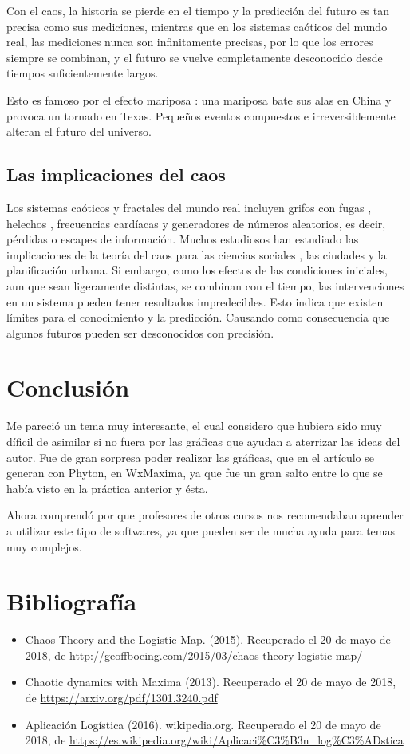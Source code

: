 \documentclass{article}
\begin{document}
Con el caos, la historia se pierde en el tiempo y la predicción del futuro es tan precisa como sus mediciones, mientras que en los sistemas caóticos del mundo real, las mediciones nunca son infinitamente precisas, por lo que los errores siempre se combinan, y el futuro se vuelve completamente desconocido desde tiempos suficientemente largos.

Esto es famoso por el efecto mariposa : una mariposa bate sus alas en China y provoca un tornado en Texas. Pequeños eventos compuestos e irreversiblemente alteran el futuro del universo.

\subsection{Las implicaciones del caos}

Los sistemas caóticos y fractales del mundo real incluyen grifos con fugas , helechos , frecuencias cardíacas y generadores de números aleatorios, es decir, pérdidas o escapes de información. Muchos estudiosos han estudiado las implicaciones de la teoría del caos para las ciencias sociales , las ciudades y la planificación urbana. Si embargo, como los efectos de las condiciones iniciales, aun que sean ligeramente distintas, se combinan con el tiempo, las intervenciones en un sistema pueden tener resultados impredecibles. Esto indica que existen límites para el conocimiento y la predicción. Causando como consecuencia que algunos futuros pueden ser desconocidos con precisión.

\section{Conclusión}

Me pareció un tema muy interesante, el cual considero que hubiera sido muy díficil de asimilar si no fuera por las gráficas que ayudan a aterrizar las ideas del autor. Fue de gran sorpresa poder realizar las gráficas, que en el artículo se generan con Phyton, en WxMaxima, ya que fue un gran salto entre lo que se había visto en la práctica anterior y ésta.

Ahora comprendó por que profesores de otros cursos nos recomendaban aprender a utilizar este tipo de softwares, ya que pueden ser de mucha ayuda para temas muy complejos.

\section{Bibliografía}

\begin{itemize}
\item Chaos Theory and the Logistic Map. (2015). Recuperado el 20 de mayo de 2018, de \url{http://geoffboeing.com/2015/03/chaos-theory-logistic-map/}
\item Chaotic dynamics with Maxima (2013). Recuperado el 20 de mayo de 2018, de \url{https://arxiv.org/pdf/1301.3240.pdf}
\item Aplicación Logística (2016). wikipedia.org. Recuperado el 20 de mayo de 2018, de \url{https://es.wikipedia.org/wiki/Aplicaci%C3%B3n_log%C3%ADstica}
\end{itemize}
\end{document}
